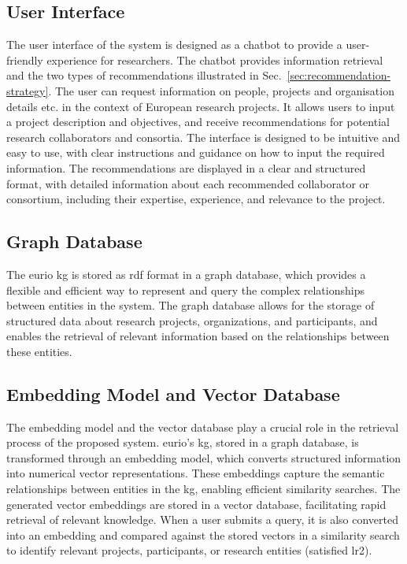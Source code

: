 \subsection*{User Interface}
The user interface of the system is designed as a chatbot to provide a user-friendly experience for researchers.
The chatbot provides information retrieval and the two types of recommendations illustrated in Sec.~\ref{sec:recommendation-strategy}.
The user can request information on people, projects and organisation details etc. in the context of European research projects.
It allows users to input a project description and objectives, and receive recommendations for potential research collaborators and consortia.
The interface is designed to be intuitive and easy to use, with clear instructions and guidance on how to input the required information.
The recommendations are displayed in a clear and structured format, with detailed information about each recommended collaborator or consortium, including their expertise, experience, and relevance to the project.

\subsection*{Graph Database}
The \gls{eurio} \gls{kg} is stored as \gls{rdf} format in a graph database, which provides a flexible and efficient way to represent and query the complex relationships between entities in the system.
The graph database allows for the storage of structured data about research projects, organizations, and participants, and enables the retrieval of relevant information based on the relationships between these entities.

\subsection*{Embedding Model and Vector Database}
The embedding model and the vector database play a crucial role in the retrieval process of the proposed system.
\gls{eurio}'s \gls{kg}, stored in a graph database, is transformed through an embedding model, which converts structured information into numerical vector representations.
These embeddings capture the semantic relationships between entities in the \gls{kg}, enabling efficient similarity searches.
The generated vector embeddings are stored in a vector database, facilitating rapid retrieval of relevant knowledge.
When a user submits a query, it is also converted into an embedding and compared against the stored vectors in a similarity search to identify relevant projects, participants, or research entities (satisfied \gls{lr}2).

